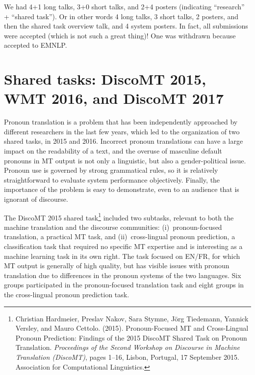 \documentclass[11pt]{article}
\begin{document}
We had 4+1 long talks, 3+0 short talks, and 2+4 posters (indicating ``research'' + ``shared task'').
Or in other words 4 long talks, 3 short talks, 2 posters, and then the shared task overview talk, and 4 system posters.
In fact, all submissions were accepted (which is not such a great thing)!  One was withdrawn because accepted to EMNLP.



\section{Shared tasks: DiscoMT 2015, WMT 2016, and DiscoMT 2017}


Pronoun translation is a problem that has been independently approached
by different researchers in the last few years, which led to the organization of two shared tasks, in 2015 and 2016.
Incorrect pronoun translations can have a large impact on the readability
of a text, and the overuse of masculine default pronouns in MT output is not
only a linguistic, but also a gender-political issue.
Pronoun use is governed by strong grammatical rules, so it is relatively
straightforward to evaluate system performance objectively. Finally, the
importance of the problem is easy to demonstrate, even to an audience that is
ignorant of discourse.

The DiscoMT 2015 shared task\footnote{Christian Hardmeier, Preslav Nakov, Sara Stymne, Jörg Tiedemann, Yannick Versley, and Mauro Cettolo. (2015). Pronoun-Focused MT and Cross-Lingual Pronoun Prediction: Findings of the 2015 DiscoMT Shared Task on Pronoun Translation.  \textit{Proceedings of the Second Workshop on Discourse in Machine Translation (DiscoMT)}, pages 1–16, Lisbon, Portugal, 17 September 2015.  Association for Computational Linguistics.}
included two subtasks, relevant to both the machine translation and the discourse communities: (i)~pronoun-focused translation, a practical
MT task, and (ii)~cross-lingual pronoun prediction, a classification task that required no specific MT expertise and is interesting as a machine learning task in its own right. The task focused on EN/FR, for which MT output is generally of high quality, but has visible issues with pronoun translation due
to differences in the pronoun systems of the two languages. Six groups participated in the pronoun-focused translation task and eight groups in the cross-lingual pronoun prediction task.
\end{document}
